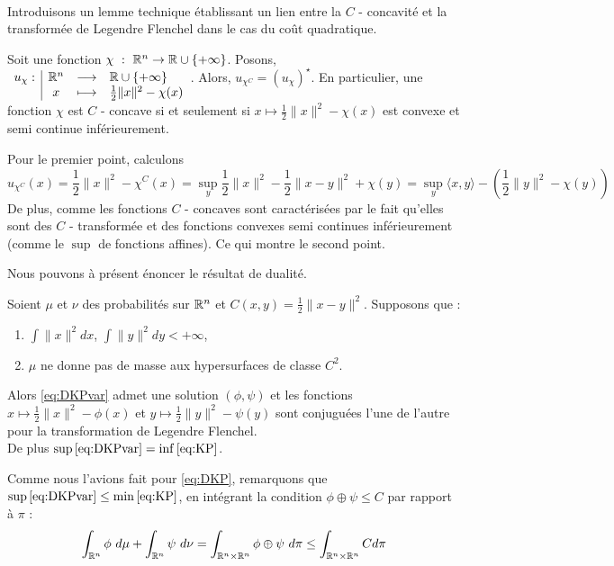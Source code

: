 \documentclass[a4paper,12pt]{article}
\begin{document}
\\

Introduisons un lemme technique établissant un lien entre la $C$ - concavité et la transformée de Legendre Flenchel dans le cas du coût quadratique. 

\begin{lemme}
Soit une fonction $\chi\ :\ \mathbb{R}^n \rightarrow \mathbb{R}\cup\{+\infty\}$. Posons, $\begin{array}[t]{l|ccl} u_{\chi}: & \mathbb{R}^n & \longrightarrow & \mathbb{R}\cup\{+\infty\} \\ & x & \longmapsto & \frac{1}{2}\|x\|^2-\chi(x) \end{array} $. Alors, $u_{\chi^C} = (u_{\chi})^{\star}$. En particulier, une fonction $\chi$ est $C$ - concave si et seulement si $x\mapsto\frac{1}{2}\|x\|^2-\chi(x)$ est convexe et semi continue inférieurement. 
\end{lemme}
\begin{preuve}
Pour le premier point, calculons 
$$
u_{\chi^C}(x) =\frac{1}{2}\|x\|^2 - \chi^C(x)=\sup_y \frac{1}{2}\|x\|^2  - \frac{1}{2}\|x - y\|^2 + \chi(y) = \sup_y \langle x,y\rangle - \left( \frac{1}{2}\|y\|^2 - \chi(y)\right) 
$$
De plus, comme les fonctions $C$ - concaves sont caractérisées par le fait qu'elles sont des $C$ - transformée et des fonctions convexes semi continues inférieurement (comme le $\sup$ de fonctions affines). Ce qui montre le second point.
\end{preuve}
Nous pouvons à présent énoncer le résultat de dualité. 
\newpage
\begin{theoreme}{}
Soient $\mu$ et $\nu$ des probabilités sur $\mathbb{R}^n$ et $C(x,y)=\frac{1}{2}\|x-y\|^2$. Supposons que : 
\begin{enumerate}
\item $\int\|x\|^2dx$, $\int\|y\|^2dy<+\infty$,
\item $\mu$ ne donne pas de masse aux hypersurfaces de classe $C^2$.
\end{enumerate}
Alors \eqref{eq:DKPvar} admet une solution $(\phi,\psi)$ et les fonctions $x\mapsto\frac{1}{2}\|x\|^2-\phi(x)$ et $y\mapsto\frac{1}{2}\|y\|^2-\psi(y)$ sont conjuguées l'une de l'autre pour la transformation de Legendre Flenchel.\\
De plus $\sup\eqref{eq:DKPvar}=\inf\eqref{eq:KP}$. 
\end{theoreme}
Comme nous l'avions fait pour \eqref{eq:DKP}, remarquons que $\sup\eqref{eq:DKPvar}\leq \min\eqref{eq:KP}$, en intégrant la condition $\phi\oplus\psi\leq C$ par rapport à $\pi$ : 
$$
\int_{\mathbb{R}^n}\phi\ d\mu + \int_{\mathbb{R}^n}\psi\ d\nu = \int_{\mathbb{R}^n\times\mathbb{R}^n} \phi\oplus\psi\ d\pi \leq\int_{\mathbb{R}^n\times\mathbb{R}^n} C d\pi 
$$
\end{document}
